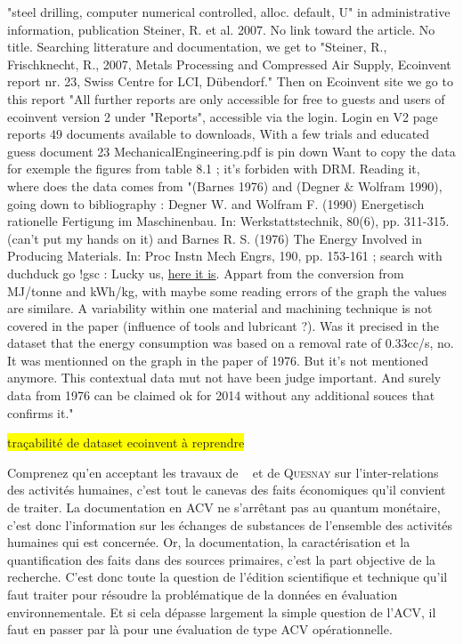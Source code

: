     "steel drilling, computer numerical controlled, alloc. default, U" in administrative information, publication Steiner, R. et al. 2007. No link toward the article. No title.
    Searching litterature and documentation, we get to "Steiner, R., Frischknecht, R., 2007, Metals Processing and Compressed Air Supply, Ecoinvent report nr. 23, Swiss Centre for LCI, Dübendorf."
    Then on Ecoinvent site we go to this report "All further reports are only accessible for free to guests and users of ecoinvent version 2 under "Reports", accessible via the login.
    Login en V2 page reports 49 documents available to downloads,
    With a few trials and educated guess document 23 MechanicalEngineering.pdf is pin down
    Want to copy the data for exemple the figures from table 8.1 ; it's forbiden with DRM.
    Reading it, where does the data comes from "(Barnes 1976) and (Degner \& Wolfram 1990), going down to bibliography :
    Degner W. and Wolfram F. (1990) Energetisch rationelle Fertigung im Maschinenbau. In: Werkstattstechnik, 80(6), pp. 311-315. (can't put my hands on it) and Barnes R. S. (1976) The Energy Involved in Producing Materials. In: Proc Instn Mech Engrs, 190, pp. 153-161 ; search with duchduck go !gsc : Lucky us, \href{http://pme.sagepub.com/content/190/1/153}{here it is}.
    Appart from the conversion from MJ/tonne and kWh/kg, with maybe some reading errors of the graph the values are similare. A variability within one material and machining technique is not covered in the paper (influence of tools and lubricant ?). Was it precised in the dataset that the energy consumption was based on a removal rate of 0.33cc/s, no. It was mentionned on the graph in the paper of 1976. But it's not mentioned anymore. This contextual data mut not have been judge important.
    And surely data from 1976 can be claimed ok for 2014 without any additional souces that confirms it."

\begin{center}\colorbox{yellow}{traçabilité de dataset ecoinvent à reprendre}\end{center}

Comprenez qu'en acceptant les travaux de \citeauthor{leontief_quantitative_1936}~\cite{leontief_quantitative_1936} et de \textsc{Quesnay} sur l'inter-relations des activités humaines, c'est tout le canevas des faits économiques qu'il convient de traiter.
La documentation en \gls{ACV} ne s’arrêtant pas au quantum monétaire, c'est donc l'information sur les échanges de substances de l'ensemble des activités humaines qui est concernée.
Or, la documentation, la caractérisation et la quantification des faits dans des sources primaires, c'est la part objective de la recherche.
C'est donc toute la question de l'édition scientifique et technique qu'il faut traiter pour résoudre la problématique de la données en évaluation environnementale.
Et si cela dépasse largement la simple question de l'ACV, il faut en passer par là pour une évaluation de type ACV opérationnelle.

